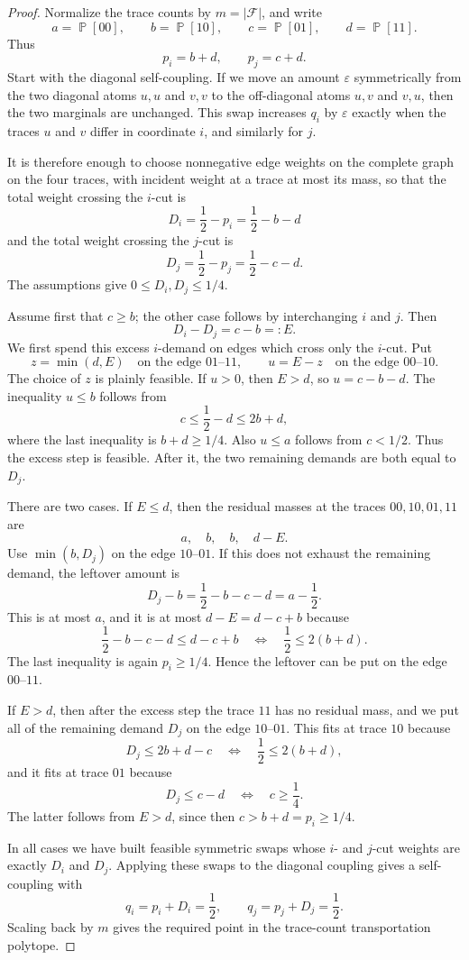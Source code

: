 \documentclass[11pt]{article}
\DeclareMathOperator{\Prb}{\mathbb{P}}
\begin{document}
\begin{proof}
Normalize the trace counts by $m=|\mathcal{F}|$, and write
\[
  a=\Prb[00],\qquad b=\Prb[10],\qquad
  c=\Prb[01],\qquad d=\Prb[11].
\]
Thus
\[
  p_i=b+d,\qquad p_j=c+d.
\]
Start with the diagonal self-coupling.  If we move an amount $\varepsilon$
symmetrically from the two diagonal atoms $u,u$ and $v,v$ to the off-diagonal
atoms $u,v$ and $v,u$, then the two marginals are unchanged.  This swap
increases $q_i$ by $\varepsilon$ exactly when the traces $u$ and $v$ differ in
coordinate $i$, and similarly for $j$.

It is therefore enough to choose nonnegative edge weights on the complete
graph on the four traces, with incident weight at a trace at most its mass,
so that the total weight crossing the $i$-cut is
\[
  D_i=\frac12-p_i=\frac12-b-d
\]
and the total weight crossing the $j$-cut is
\[
  D_j=\frac12-p_j=\frac12-c-d.
\]
The assumptions give $0\leq D_i,D_j\leq 1/4$.

Assume first that $c\geq b$; the other case follows by interchanging
$i$ and $j$.  Then
\[
  D_i-D_j=c-b=:E.
\]
We first spend this excess $i$-demand on edges which cross only the $i$-cut.
Put
\[
  z=\min(d,E)
  \quad\text{on the edge }01\text{--}11,
  \qquad
  u=E-z
  \quad\text{on the edge }00\text{--}10.
\]
The choice of $z$ is plainly feasible.  If $u>0$, then $E>d$, so
$u=c-b-d$.  The inequality $u\leq b$ follows from
\[
  c\leq \frac12-d\leq 2b+d,
\]
where the last inequality is $b+d\geq 1/4$.  Also $u\leq a$ follows from
$c<1/2$.  Thus the excess step is feasible.  After it, the two remaining
demands are both equal to $D_j$.

There are two cases.  If $E\leq d$, then the residual masses at the traces
$00,10,01,11$ are
\[
  a,\quad b,\quad b,\quad d-E.
\]
Use $\min(b,D_j)$ on the edge $10$--$01$.  If this does not exhaust the
remaining demand, the leftover amount is
\[
  D_j-b=\frac12-b-c-d=a-\frac12.
\]
This is at most $a$, and it is at most $d-E=d-c+b$ because
\[
  \frac12-b-c-d\leq d-c+b
  \quad\Longleftrightarrow\quad
  \frac12\leq 2(b+d).
\]
The last inequality is again $p_i\geq 1/4$.  Hence the leftover can be put on
the edge $00$--$11$.

If $E>d$, then after the excess step the trace $11$ has no residual mass, and
we put all of the remaining demand $D_j$ on the edge $10$--$01$.  This fits at
trace $10$ because
\[
  D_j\leq 2b+d-c
  \quad\Longleftrightarrow\quad
  \frac12\leq 2(b+d),
\]
and it fits at trace $01$ because
\[
  D_j\leq c-d
  \quad\Longleftrightarrow\quad
  c\geq \frac14.
\]
The latter follows from $E>d$, since then $c>b+d=p_i\geq 1/4$.

In all cases we have built feasible symmetric swaps whose $i$- and $j$-cut
weights are exactly $D_i$ and $D_j$.  Applying these swaps to the diagonal
coupling gives a self-coupling with
\[
  q_i=p_i+D_i=\frac12,
  \qquad
  q_j=p_j+D_j=\frac12.
\]
Scaling back by $m$ gives the required point in the trace-count
transportation polytope.
\end{proof}
\end{document}
